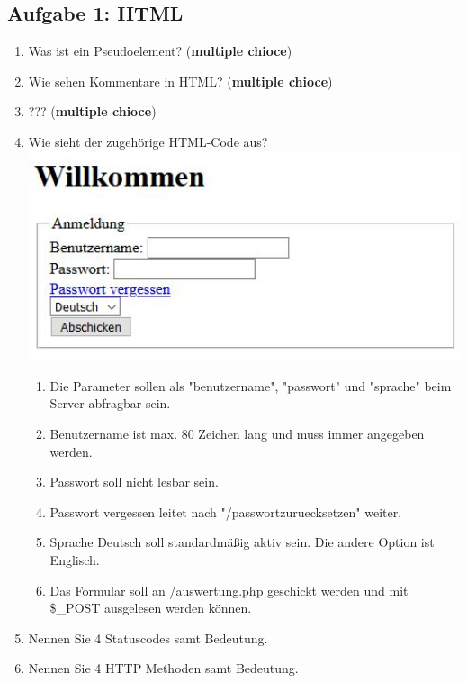 \subsection{Aufgabe 1: HTML}
\label{sec:Aufgabe1}
\begin{enumerate}[label=\alph*)]
    \item Was ist ein Pseudoelement? (\textbf{multiple chioce})
    \item Wie sehen Kommentare in HTML? (\textbf{multiple chioce})
    \item ??? (\textbf{multiple chioce})
    \item Wie sieht der zugehörige HTML-Code aus? \\
        \includegraphics[width=15cm]{img/klausur.JPG}
        \begin{enumerate}[label=\arabic*.]
            \item Die Parameter sollen als "benutzername", "passwort" und "sprache"
                beim Server abfragbar sein.
            \item Benutzername ist max. 80 Zeichen lang und muss immer angegeben werden.
            \item Passwort soll nicht lesbar sein.
            \item Passwort vergessen leitet nach "/passwortzuruecksetzen" weiter.
            \item Sprache Deutsch soll standardmäßig aktiv sein. Die andere Option
                ist Englisch.
            \item Das Formular soll an /auswertung.php geschickt werden und mit
                \$\_POST ausgelesen werden können.
         \end{enumerate}
    \item Nennen Sie 4 Statuscodes samt Bedeutung.
    \item Nennen Sie 4 HTTP Methoden samt Bedeutung.
\end{enumerate}

